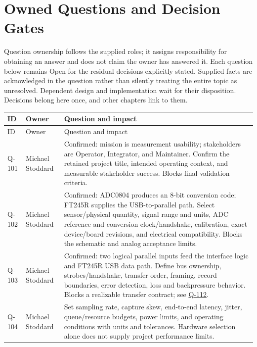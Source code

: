 \section{Owned Questions and Decision Gates}
\label{Section:OwnedQuestions}
Question ownership follows the supplied roles; it assigns responsibility for obtaining an answer and does not claim the owner has answered it. Each question below remains Open for the residual decisions explicitly stated. Supplied facts are acknowledged in the question rather than silently treating the entire topic as unresolved. Dependent design and implementation wait for their disposition. Decisions belong here once, and other chapters link to them.
\small
\begin{tabularx}{\linewidth}{L{1.3cm}L{3.1cm}Y}
\caption{Owned Questions\label{Table:OwnedQuestions}}\\
\toprule
ID & Owner & Question and impact\\\midrule
\endfirsthead
\toprule
ID & Owner & Question and impact\\\midrule
\endhead
\bottomrule
\endlastfoot
{}\label{Question:Q-101}Q-101 & Michael Stoddard & Confirmed: mission is measurement usability; stakeholders are Operator, Integrator, and Maintainer. Confirm the retained project title, intended operating context, and measurable stakeholder success. Blocks final validation criteria.\\
\label{Question:Q-102}Q-102 & Michael Stoddard & Confirmed: ADC0804 produces an 8-bit conversion code; FT245R supplies the USB-to-parallel path. Select sensor/physical quantity, signal range and units, ADC reference and conversion clock/handshake, calibration, exact device/board revisions, and electrical compatibility. Blocks the schematic and analog acceptance limits.\\
\label{Question:Q-103}Q-103 & Michael Stoddard & Confirmed: two logical parallel inputs feed the interface logic and FT245R USB data path. Define bus ownership, strobes/handshake, transfer order, framing, record boundaries, error detection, loss and backpressure behavior. Blocks a realizable transfer contract; see \hyperref[Question:Q-112]{Q-112}.\\
\label{Question:Q-104}Q-104 & Michael Stoddard & Set sampling rate, capture skew, end-to-end latency, jitter, queue/resource budgets, power limits, and operating conditions with units and tolerances. Hardware selection alone does not supply project performance limits.\\

\end{tabularx}
